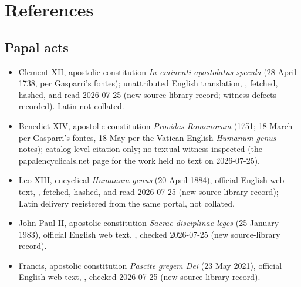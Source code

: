 \section{References}

\begingroup
\setlength{\parskip}{0pt}
\titlespacing*{\subsection}{0pt}{1.0ex}{0.3ex}

\subsection*{Papal acts}

{\fontsize{8.6}{9.6}\selectfont
\begin{itemize}[itemsep=0pt,parsep=0pt,topsep=0.05em]
\item Clement XII, apostolic constitution \emph{In eminenti apostolatus specula} (28 April 1738, per Gasparri's fontes); unattributed English translation, , fetched, hashed, and read 2026-07-25 (new source-library record; witness defects recorded). Latin not collated.
\item Benedict XIV, apostolic constitution \emph{Providas Romanorum} (1751; 18 March per Gasparri's fontes, 18 May per the Vatican English \emph{Humanum genus} notes); catalog-level citation only; no textual witness inspected (the papalencyclicals.net page for the work held no text on 2026-07-25).
\item Leo XIII, encyclical \emph{Humanum genus} (20 April 1884), official English web text, , fetched, hashed, and read 2026-07-25 (new source-library record); Latin delivery registered from the same portal, not collated.
\item John Paul II, apostolic constitution \emph{Sacrae disciplinae leges} (25 January 1983), official English web text, , checked 2026-07-25 (new source-library record).
\item Francis, apostolic constitution \emph{Pascite gregem Dei} (23 May 2021), official English web text, , checked 2026-07-25 (new source-library record).
\end{itemize}}


